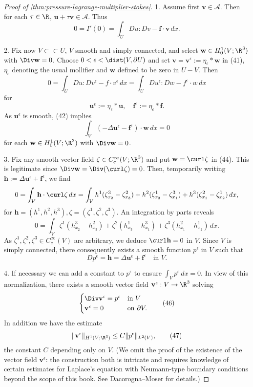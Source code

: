 \begin{proof}[Proof of \cref{thm:pressure-lagrange-multiplier-stokes}]
1. Assume first $\mathbf{v} \in \mathcal{A}$. Then for each $\tau \in \R$, $\mathbf{u} + \tau \mathbf{v} \in \mathcal{A}$. Thus
\[
0 = I'(0) = \int_U Du : Dv - \mathbf{f} \cdot \mathbf{v} \, dx.
\tag{41}
\]

2. Fix now $V \subset\subset U$, $V$ smooth and simply connected, and select $\mathbf{w} \in H_0^1(V;\R^3)$ with $\Div \mathbf{w} = 0$. Choose $0 < \epsilon < \dist(V, \partial U)$ and set $\mathbf{v} = \mathbf{v}^\epsilon := \eta_\epsilon * \mathbf{w}$ in (41), $\eta_\epsilon$ denoting the usual mollifier and $\mathbf{w}$ defined to be zero in $U - V$. Then
\[
0 = \int_U Du : Dv^\epsilon - f \cdot v^\epsilon\, dx = \int_U Du^\epsilon : Dw - f^\epsilon \cdot w\, dx
\tag{42}
\]
for
\[
\mathbf{u}^\epsilon := \eta_\epsilon * \mathbf{u}, \quad \mathbf{f}^\epsilon := \eta_\epsilon * \mathbf{f}.
\tag{43}
\]
As $\mathbf{u}^\epsilon$ is smooth, (42) implies
\[
\int_V (-\Delta \mathbf{u}^\epsilon - \mathbf{f}^\epsilon) \cdot \mathbf{w}\, dx = 0
\tag{44}
\]
for each $\mathbf{w} \in H_0^1(V;\R^3)$ with $\Div \mathbf{w} = 0$.

3. Fix any smooth vector field $\zeta \in C_c^\infty(V;\R^3)$ and put $\mathbf{w} = \curl \zeta$ in (44). This is legitimate since $\Div \mathbf{w} = \Div(\curl \zeta) = 0$. Then, temporarily writing $\mathbf{h} := \Delta \mathbf{u}^\epsilon + \mathbf{f}^\epsilon$, we find
\[
0 = \int_V \mathbf{h} \cdot \curl \zeta\, dx = \int_V h^1(\zeta_{x_2}^3 - \zeta_{x_3}^2) + h^2(\zeta_{x_3}^1 - \zeta_{x_1}^3) + h^3(\zeta_{x_1}^2 - \zeta_{x_2}^1)\, dx,
\]
for $\mathbf{h} = (h^1, h^2, h^3), \zeta = (\zeta^1, \zeta^2, \zeta^3)$. An integration by parts reveals
\[
0 = \int_V \zeta^1(h_{x_2}^3 - h_{x_3}^2) + \zeta^2(h_{x_3}^1 - h_{x_1}^3) + \zeta^3(h_{x_1}^2 - h_{x_2}^1)\, dx.
\]
As $\zeta^1, \zeta^2, \zeta^3 \in C_c^\infty(V)$ are arbitrary, we deduce $\curl \mathbf{h} = 0$ in $V$. Since $V$ is simply connected, there consequently exists a smooth function $p^\epsilon$ in $V$ such that
\[
Dp^\epsilon = \mathbf{h} = \Delta \mathbf{u}^\epsilon + \mathbf{f}^\epsilon \quad \text{in } V.
\tag{45}
\]

4. If necessary we can add a constant to $p^\epsilon$ to ensure $\int_V p^\epsilon\, dx = 0$. In view of this normalization, there exists a smooth vector field $\mathbf{v}^\epsilon: V \to \R^3$ solving
\[
\begin{cases} \Div \mathbf{v}^\epsilon = p^\epsilon & \text{in } V \\ \mathbf{v}^\epsilon = 0 & \text{on } \partial V. \end{cases}
\tag{46}
\]
In addition we have the estimate
\[
\|\mathbf{v}^\epsilon\|_{H^1(V;\R^3)} \le C\|p^\epsilon\|_{L^2(V)},
\tag{47}
\]
the constant $C$ depending only on $V$. (We omit the proof of the existence of the vector field $\mathbf{v}^\epsilon$: the construction both is intricate and requires knowledge of certain estimates for Laplace's equation with Neumann-type boundary conditions beyond the scope of this book. See Dacorogna--Moser \cite{DacorognaMoser1990} for details.)


\end{proof}

